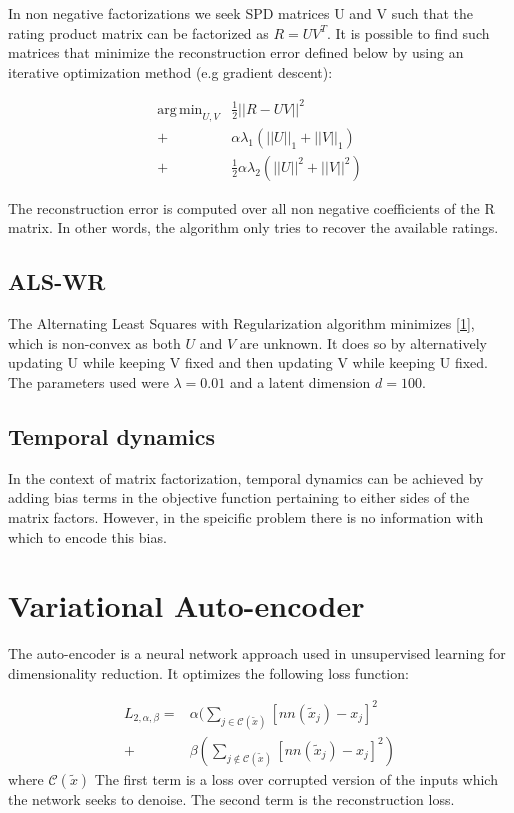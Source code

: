 \documentclass[10pt,twocolumn]{article}
\DeclareMathOperator*{\argmin}{arg\,min}
\begin{document}
In non negative factorizations we seek SPD matrices U and V such that the rating product matrix can be factorized as $R = UV^T$. It is possible to find such matrices that minimize the reconstruction error defined below by using an iterative optimization method (e.g gradient descent): 

\begin{equation}
\begin{split}
\argmin_{U,V} & \frac{1}{2} ||R - UV||^2 \\
			  + & \alpha \lambda_1 (||U||_1 + ||V||_1) \\
			  + & \frac{1}{2} \alpha \lambda_2  (||U||^2 + ||V||^2) 
\end{split}
\end{equation}  

The reconstruction error is computed over all non negative coefficients of the R matrix. In other words, the algorithm only tries to recover the available ratings. 

\subsection{ALS-WR}

The Alternating Least Squares with Regularization algorithm \cite{zhou2008large}  minimizes \eqref{1}, which is non-convex as both $U$ and $V$ are unknown. It does so by alternatively updating U while keeping V fixed and then updating V while keeping U fixed. The parameters used were $\lambda = 0.01$ and a latent dimension $d = 100$.

\subsection{Temporal dynamics}
In the context of matrix factorization, temporal dynamics can be achieved by adding bias terms in the objective function pertaining to either sides of the matrix factors. However, in the speicific problem there is no information with which to encode this bias.

\section{Variational Auto-encoder}

The auto-encoder is a neural network approach used in unsupervised learning for dimensionality reduction. It optimizes the following loss function:

\begin{equation}
\begin{split}
L_{2, \alpha, \beta} = &\alpha ( \sum_{j \in \mathcal{C}(\tilde{x})} [ nn(\tilde{x}_j) - x_j ]^2 \\
+ & \beta ( \sum_{j \notin \mathcal{C}(\tilde{x})} [nn(\tilde{x}_j) - x_j ]^2)
\end{split}
\end{equation}
where $\mathcal{C}(\tilde{x})$ The first term is a loss over corrupted version of the inputs which the network seeks to denoise. The second term is the reconstruction loss.
\end{document}
